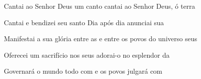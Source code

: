 \begin{greenumerate}
  \item {}Cantai ao Senhor Deus um canto  cantai ao Senhor Deus, ó terra 

  \item {}Cantai e bendizei seu santo  Dia após dia anunciai sua 

  \item {}Manifestai a sua glória entre as  e entre os povos do universo seus 

  \item {}Oferecei um sacrifício nos seus  adorai-o no esplendor da 

  \item {}Governará o mundo todo com  e os povos julgará com 
\end{greenumerate}